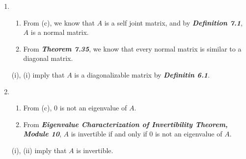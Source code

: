 \documentclass{uofa-eng-assignment}
\begin{document}
\begin{enumerate}
\begin{enumerate}
\begin{enumerate}
	      	\item From (b), we know that every vector which is orthogonal to $\vb{w}$ is an eigenvector of $A$. Together with $\vb{w}$, the set of all orthorgonal vectors to $\vb{w}$ will span $A$. Thus the basis would have $n$ vectors including $\vb{w}$. Thus there are $n - 1$ linearly independent vectors orthogonal to $\vb{w}$ and the eigenvalue of each of them is 1. 
	      \end{enumerate}
	      From (i), (ii), (iii) and along with \textbf{\textit{Theorem 7.46}}, we have $Z = \text{diag}(1, ..., 1, 8) \in \mathbb{R}^{n\times n}$.
	\item 
	      \begin{enumerate}
	      	\item From (c), we know that $A$ is a self joint matrix, and by \textbf{\textit{Definition 7.1}}, $A$ is a normal matrix.
	      	\item From \textbf{\textit{Theorem 7.35}}, we know that every normal matrix is similar to a diagonal matrix.
	      \end{enumerate}
	      (i), (i) imply that $A$ is a diagonalizable matrix by \textbf{\textit{Definitin 6.1}}.
	\item
	      \begin{enumerate}
	      	\item From (c), 0 is not an eigenvalue of $A$.
	      	\item From \textbf{\textit{Eigenvalue Characterization of Invertibility Theorem, Module 10}}, $A$ is invertible if and only if 0 is not an eigenvalue of $A$.
	      \end{enumerate}
	      (i), (ii) imply that $A$ is invertible.
\end{enumerate}        
        
\end{enumerate}
\end{document}
